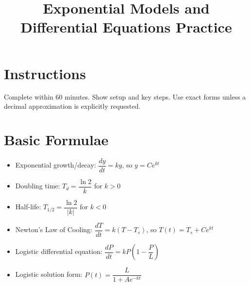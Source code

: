 \documentclass[12pt]{article}
\title{Exponential Models and Differential Equations Practice}
\author{}
\date{}
\begin{document}
\maketitle

\section*{Instructions}
Complete within 60 minutes. Show setup and key steps. Use exact forms unless a decimal approximation is explicitly requested.

\section*{Basic Formulae}
\begin{itemize}[leftmargin=1.5em]
  \item Exponential growth/decay: $\dfrac{dy}{dt}=ky$, so $y=Ce^{kt}$
  \item Doubling time: $T_d=\dfrac{\ln 2}{k}$ for $k>0$
  \item Half-life: $T_{1/2}=\dfrac{\ln 2}{|k|}$ for $k<0$
  \item Newton's Law of Cooling: $\dfrac{dT}{dt}=k(T-T_s)$, so $T(t)=T_s+Ce^{kt}$
  \item Logistic differential equation: $\dfrac{dP}{dt}=kP\left(1-\dfrac{P}{L}\right)$
  \item Logistic solution form: $P(t)=\dfrac{L}{1+Ae^{-kt}}$
\end{itemize}
\end{document}
